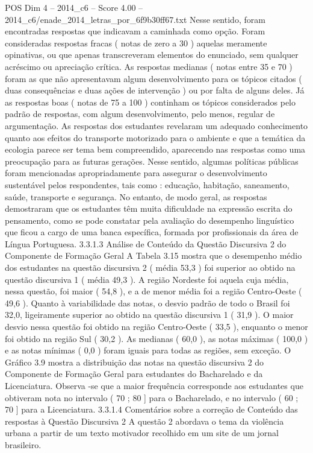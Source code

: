 \begin{textsample}{POS Dim 4 – 2014\_c6 – Score 4.00 – 2014\_c6/enade\_2014\_letras\_por\_6f9b30ff67.txt}
Nesse sentido, foram encontradas respostas que indicavam a caminhada como opção.
Foram consideradas respostas fracas ( notas de zero a 30 ) aquelas meramente opinativas, ou que apenas transcreveram elementos do enunciado, sem qualquer acréscimo ou apreciação crítica.
As respostas medianas ( notas entre 35 e 70 ) foram as que não apresentavam algum desenvolvimento para os tópicos citados ( duas consequências e duas ações de intervenção ) ou por falta de alguns deles.
Já as respostas boas ( notas de 75 a 100 ) continham os tópicos considerados pelo padrão de respostas, com algum desenvolvimento, pelo menos, regular de argumentação.
As respostas dos estudantes revelaram um adequado conhecimento quanto aos efeitos do transporte motorizado para o ambiente e que a temática da ecologia parece ser tema bem compreendido, aparecendo nas respostas como uma preocupação para as futuras gerações.
Nesse sentido, algumas políticas públicas foram mencionadas apropriadamente para assegurar o desenvolvimento sustentável pelos respondentes, tais como : educação, habitação, saneamento, saúde, transporte e segurança.
No entanto, de modo geral, as respostas demostraram que os estudantes têm muita dificuldade na expressão escrita do pensamento, como se pode constatar pela avaliação do desempenho linguístico que ficou a cargo de uma banca específica, formada por profissionais da área de Língua Portuguesa. 3.3.1.3 Análise de Conteúdo da Questão Discursiva 2 do Componente de Formação Geral A Tabela 3.15 mostra que o desempenho médio dos estudantes na questão discursiva 2 ( média 53,3 ) foi superior ao obtido na questão discursiva 1 ( média 49,3 ).
A região Nordeste foi aquela cuja média, nessa questão, foi maior ( 54,8 ), e a de menor média foi a região Centro-Oeste ( 49,6 ).
Quanto à variabilidade das notas, o desvio padrão de todo o Brasil foi 32,0, ligeiramente superior ao obtido na questão discursiva 1 ( 31,9 ).
O maior desvio nessa questão foi obtido na região Centro-Oeste ( 33,5 ), enquanto o menor foi obtido na região Sul ( 30,2 ).
As medianas ( 60,0 ), as notas máximas ( 100,0 ) e as notas mínimas ( 0,0 ) foram iguais para todas as regiões, sem exceção.
O Gráfico 3.9 mostra a distribuição das notas na questão discursiva 2 do Componente de Formação Geral para estudantes do Bacharelado e da Licenciatura.
Observa -se que a maior frequência corresponde aos estudantes que obtiveram nota no intervalo ( 70 ; 80 ] para o Bacharelado, e no intervalo ( 60 ; 70 ] para a Licenciatura. 3.3.1.4 Comentários sobre a correção de Conteúdo das respostas à Questão Discursiva 2 A questão 2 abordava o tema da violência urbana a partir de um texto motivador recolhido em um site de um jornal brasileiro.

\end{textsample}

